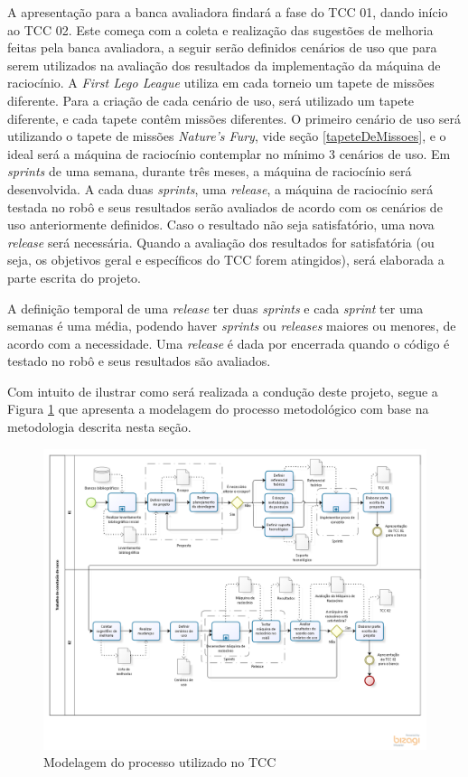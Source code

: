 A apresentação para a banca avaliadora findará a fase do TCC 01, dando início ao TCC 02. Este começa com a coleta e realização das sugestões de melhoria feitas pela banca avaliadora, a seguir serão definidos cenários de uso que para serem utilizados na avaliação dos resultados da implementação da máquina de raciocínio. 
A \textit{First Lego League} utiliza em cada torneio um tapete de missões diferente. Para a criação de cada cenário de uso, será utilizado um tapete diferente, e cada tapete contêm  missões diferentes. O primeiro cenário de uso será utilizando o tapete de missões \textit{Nature's Fury}, vide seção \ref{tapeteDeMissoes}, e o ideal será a máquina de raciocínio contemplar no mínimo 3 cenários de uso.
Em \textit{sprints} de uma semana, durante três meses, a máquina de raciocínio será desenvolvida. A cada duas \textit{sprints}, uma \textit{release}, a máquina de raciocínio será testada no robô e seus resultados serão avaliados de acordo com os cenários de uso anteriormente definidos. Caso o resultado não seja satisfatório, uma nova \textit{release} será necessária. Quando a avaliação dos resultados for satisfatória (ou seja, os objetivos geral e específicos do TCC forem atingidos), será elaborada a parte escrita do projeto.

A definição temporal de uma \textit{release} ter duas \textit{sprints} e cada \textit{sprint} ter uma semanas é uma média, podendo haver \textit{sprints} ou \textit{releases} maiores ou menores, de acordo com a necessidade. Uma \textit{release} é dada por encerrada quando o código é testado no robô e seus resultados são avaliados. 

Com intuito de ilustrar como será realizada a condução deste projeto, segue a
Figura \ref{modelagem} que apresenta a modelagem do processo metodológico com base na metodologia descrita nesta seção.

\FloatBarrier
\begin{figure}[!h]
\includegraphics[keepaspectratio=true,scale=0.54]{figuras/modelagemTcc.png}
\caption{Modelagem do processo utilizado no TCC}
\label{modelagem}
\end{figure}
\clearpage
 

